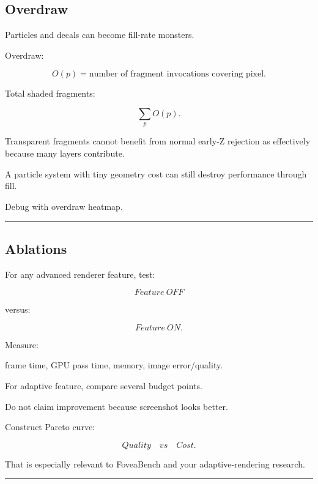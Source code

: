 \subsection{Overdraw}\label{04-visual-computing-ii-ch040-overdraw}

\hypertarget{04-visual-computing-ii-ch040-overdraw}{}

Particles and decals can become fill-rate monsters.

Overdraw:

\[
O(p)
=
\text{number of fragment invocations covering pixel}.
\]

Total shaded fragments:

\[
\sum_pO(p).
\]

Transparent fragments cannot benefit from normal early-Z rejection as effectively because many layers contribute.

A particle system with tiny geometry cost can still destroy performance through fill.

Debug with overdraw heatmap.

\begin{center}\rule{0.5\linewidth}{0.5pt}\end{center}

\subsection{Ablations}\label{04-visual-computing-ii-ch040-ablations}

\hypertarget{04-visual-computing-ii-ch040-ablations}{}

For any advanced renderer feature, test:

\[
Feature\ OFF
\]

versus:

\[
Feature\ ON.
\]

Measure:

frame time, GPU pass time, memory, image error/quality.

For adaptive feature, compare several budget points.

Do not claim improvement because screenshot looks better.

Construct Pareto curve:

\[
\boxed{
Quality
\quad vs\quad
Cost.
}
\]

That is especially relevant to FoveaBench and your adaptive-rendering research.

\begin{center}\rule{0.5\linewidth}{0.5pt}\end{center}

